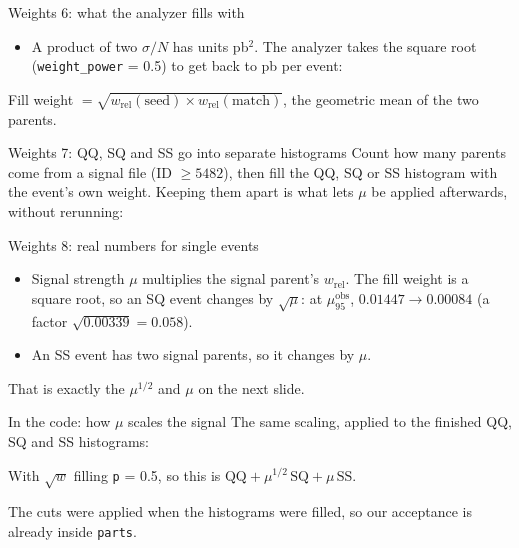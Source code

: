 \documentclass[aspectratio=169,12pt]{beamer}
\newcommand{\codesource}[1]{\par\vspace{0.2em}{\tiny\color{softgray} from #1}\par}
\newcommand{\muobs}{\mu_{95}^{\text{obs}}}
\newcommand{\takeaway}[1]{\vfill
  \colorbox{boxbg}{\parbox{0.96\textwidth}{\centering\vspace{0.3em}#1\vspace{0.3em}}}
  \par\vspace{0.6em}}
\begin{document}
\begin{frame}{Weights 6: what the analyzer fills with}
  \begin{itemize}
    \item A product of two $\sigma/N$ has units pb$^2$. The analyzer takes the
          square root (\texttt{weight\_power} = 0.5) to get back to pb per event:
  \end{itemize}
  \vspace{0.3em}
  \snipfillweight
  \codesource{\srcfillweight}
  \takeaway{Fill weight $= \sqrt{w_{\text{rel}}(\text{seed}) \times
  w_{\text{rel}}(\text{match})}$, the geometric mean of the two parents.}
\end{frame}

\begin{frame}{Weights 7: QQ, SQ and SS go into separate histograms}
  Count how many parents come from a signal file (ID $\geq 5482$), then fill the
  QQ, SQ or SS histogram with the event's own weight. Keeping them apart is what
  lets $\mu$ be applied afterwards, without rerunning:
  \vspace{0.2em}
  {\lstset{basicstyle=\ttfamily\tiny}\snippairsplit}
  \codesource{\srcpairsplit}
\end{frame}

\begin{frame}{Weights 8: real numbers for single events}
  \snipwpairs
  \codesource{\srcwpairs}
  \begin{itemize}
    \item Signal strength $\mu$ multiplies the signal parent's $w_{\text{rel}}$.
          The fill weight is a square root, so an SQ event changes by
          $\sqrt{\mu}$: at $\muobs$, $0.01447 \to 0.00084$ (a factor
          $\sqrt{0.00339} = 0.058$).
    \item An SS event has two signal parents, so it changes by $\mu$.
  \end{itemize}
  \takeaway{That is exactly the $\mu^{1/2}$ and $\mu$ on the next slide.}
\end{frame}

\begin{frame}{In the code: how $\mu$ scales the signal}
  The same scaling, applied to the finished QQ, SQ and SS histograms:
  \vspace{0.4em}
  \snipcombine
  \codesource{\srccombine}
  With $\sqrt{w}$ filling \texttt{p} = 0.5, so this is
  $\text{QQ} + \mu^{1/2}\,\text{SQ} + \mu\,\text{SS}$.
  \takeaway{The cuts were applied when the histograms were filled, so our
  acceptance is already inside \texttt{parts}.}
\end{frame}
\end{document}
